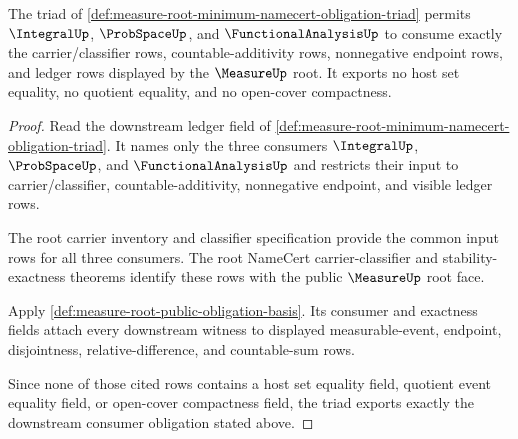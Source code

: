 \begin{theorem}
\label{thm:measure-root-minimum-downstream-consumer-obligation}
The triad of
\autoref{def:measure-root-minimum-namecert-obligation-triad} permits
$\IntegralUp$, $\ProbSpaceUp$, and $\FunctionalAnalysisUp$ to consume exactly
the carrier/classifier rows, countable-additivity rows, nonnegative endpoint
rows, and ledger rows displayed by the $\MeasureUp$ root. It exports no host
set equality, no quotient equality, and no open-cover compactness.
\end{theorem}
\begin{proof}
Read the downstream ledger field of
\autoref{def:measure-root-minimum-namecert-obligation-triad}. It names only
the three consumers $\IntegralUp$, $\ProbSpaceUp$, and
$\FunctionalAnalysisUp$ and restricts their input to carrier/classifier,
countable-additivity, nonnegative endpoint, and visible ledger rows.

The root carrier inventory and classifier specification provide the common
input rows for all three consumers. The root NameCert carrier-classifier and
stability-exactness theorems identify these rows with the public
$\MeasureUp$ root face.

Apply \autoref{def:measure-root-public-obligation-basis}. Its consumer and
exactness fields attach every downstream witness to displayed
measurable-event, endpoint, disjointness, relative-difference, and
countable-sum rows.

Since none of those cited rows contains a host set equality field, quotient
event equality field, or open-cover compactness field, the triad exports
exactly the downstream consumer obligation stated above.
\end{proof}
